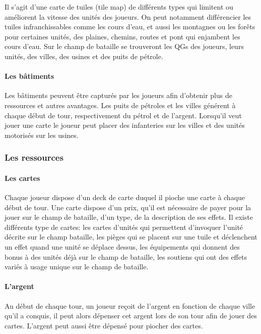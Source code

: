 Il s'agit d'une carte de tuiles (tile map) de différents types qui limitent ou améliorent la vitesse des unités des joueurs.
On peut notamment différencier les tuiles infranchissables comme les cours d'eau, et aussi les montagnes ou les forêts pour certaines unités, des plaines, chemins, routes et pont qui enjambent les cours d'eau.
Sur le champ de bataille se trouveront les QGs des joueurs, leurs unités, des villes, des usines et des puits de pétrole.



\paragraph{Les bâtiments}

Les bâtiments peuvent être capturés par les joueurs afin d'obtenir plus de ressources et autres avantages. Les puits de pétroles et les villes générent à chaque début de tour, respectivement du pétrol et de l'argent. Lorsqu'il veut jouer une carte le joueur peut placer des infanteries sur les villes et des unités motorisés sur les usines.


\subsubsection{Les ressources}

\paragraph{Les cartes}

Chaque joueur dispose d'un deck de carte duquel il pioche une carte à chaque début de tour. Une carte dispose d'un prix, qu'il est nécessaire de payer pour la jouer sur le champ de bataille, d'un type, de la description de ses effets. \n
Il existe différents type de cartes: les cartes d'unités qui permettent d'invoquer l'unité décrite sur le champ bataille, les pièges qui se placent sur une tuile et déclenchent un effet quand une unité se déplace dessus, les équipements qui donnent des bonus à des unités déjà sur le champ de bataille, les soutiens qui ont des effets variés à usage unique sur le champ de bataille.


\paragraph{L'argent}

Au début de chaque tour, un joueur reçoit de l'argent en fonction de chaque ville qu'il a conquis, il peut alors dépenser cet argent lors de son tour afin de jouer des cartes. L'argent peut aussi être dépensé pour piocher des cartes.

